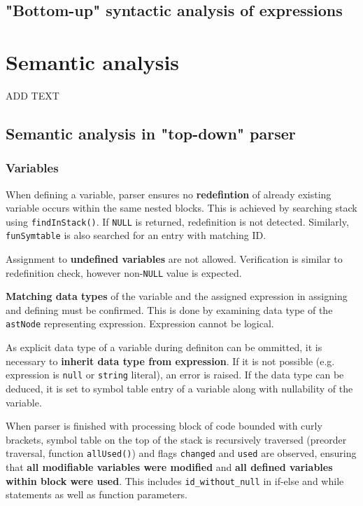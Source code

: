 \documentclass[a4paper, 11pt]{article}
\begin{document}
\subsection{"Bottom-up" syntactic analysis of expressions}\label{sec:EXPRPARSER}

\section{Semantic analysis}\label{sec:SEMANTIC}
ADD TEXT
\subsection{Semantic analysis in "top-down" parser}
\subsubsection{Variables}
When defining a variable, parser ensures no \textbf{redefintion} of already
existing variable occurs within the same nested blocks. This is achieved by searching stack using
\verb|findInStack()|. If \verb|NULL| is returned, redefinition is not detected. Similarly,
\verb|funSymtable| is also searched for an entry with matching ID.
\par Assignment to \textbf{undefined variables} are not allowed. Verification is similar to redefinition check,
however non-\verb|NULL| value is expected.
\par \textbf{Matching data types} of the variable and the assigned expression in assigning and defining must be confirmed.
This is done by examining data type of the \verb|astNode| representing expression. Expression cannot be logical.
\par As explicit data type of a variable during definiton can be ommitted, it is necessary to \textbf{inherit data type
from expression}. If it is not possible (e.g. expression is \verb|null| or \verb|string| literal), an error is raised.
If the data type can be deduced, it is set to symbol table entry of a variable along with nullability of the variable.
\par When parser is finished with processing block of code bounded with curly brackets, symbol table on the top of the stack
is recursively traversed (preorder traversal, function \verb|allUsed()|) and flags \verb|changed| and \verb|used| are observed,
ensuring that \textbf{all modifiable variables were modified} and \textbf{all defined variables within block were used}. This includes
\verb|id_without_null| in if-else and while statements as well as function parameters.
\end{document}
